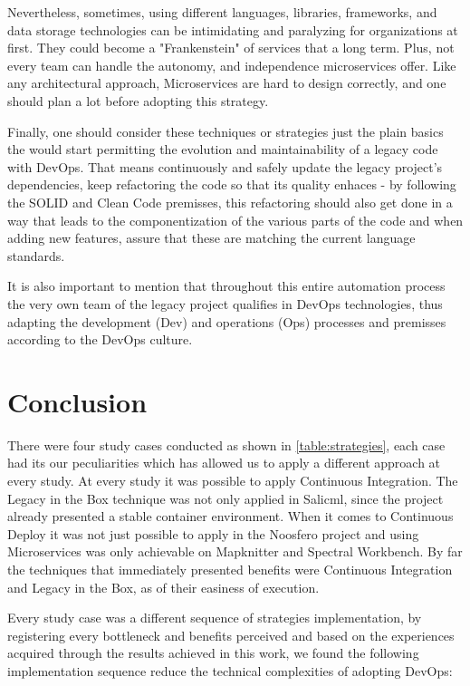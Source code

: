 Nevertheless, sometimes, using different languages, libraries, frameworks, and
data storage technologies can be intimidating and paralyzing for organizations
at first. They could become a "Frankenstein" of services that a long term. Plus,
not every team can handle the autonomy, and independence microservices offer.
Like any architectural approach, Microservices are hard to design correctly, and
one should plan a lot before adopting this strategy.

Finally, one should consider these techniques or strategies just the plain
basics the would start permitting the evolution and maintainability of a legacy
code with DevOps. That means continuously and safely update the legacy project's
dependencies, keep refactoring the code so that its quality enhaces - by
following the SOLID and Clean Code premisses, this refactoring should also get
done in a way that leads to the componentization of the various parts of the
code and when adding new features, assure that these are matching the current
language standards.

It is also important to mention that throughout this entire automation process
the very own team of the legacy project qualifies in DevOps technologies, thus
adapting the development (Dev) and operations (Ops) processes and premisses
according to the DevOps culture.

\section{Conclusion}

There were four study cases conducted as shown in \ref{table:strategies}, each
case had its our peculiarities which has allowed us to apply a different
approach at every study. At every study it was possible to apply Continuous
Integration. The Legacy in the Box technique was not only applied in Salicml,
since the project already presented a stable container environment. When it
comes to Continuous Deploy it was not just possible to apply in the Noosfero
project and using Microservices was only achievable on Mapknitter and Spectral
Workbench. By far the techniques that immediately presented benefits were
Continuous Integration and Legacy in the Box, as of their easiness of execution.

Every study case was a different sequence of strategies implementation, by
registering every bottleneck and benefits perceived and based on the experiences
acquired through the results achieved in this work, we found the following
implementation sequence reduce the technical complexities of adopting DevOps:

